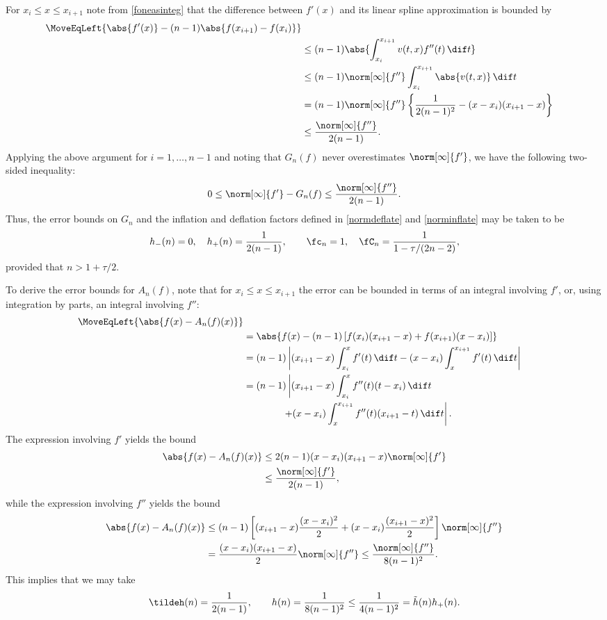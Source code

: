 For $x_{i} \le x \le x_{i+1}$ note from \eqref{foneasinteg} that the difference between $f'(x)$ and its linear spline approximation is bounded by
\begin{align*}
\MoveEqLeft{\abs{f'(x)} - (n-1) \abs{f(x_{i+1})-f(x_i)}} \\
&\le(n-1)\abs{ \int_{x_i}^{x_{i+1}} v(t,x) f''(t) \, \dif t} \\
& \le (n-1) \norm[\infty]{f''}\int_{x_i}^{x_{i+1}} \abs{v(t,x)} \, \dif t \\
&=(n-1)\norm[\infty]{f''} \left \{\frac{1}{2(n-1)^2} - (x-x_i)(x_{i+1}-x) \right\} \\
&\le \frac{\norm[\infty]{f''}}{2(n-1)}.
\end{align*}
Applying the above argument for $i=1, \ldots, n-1$ and noting that $G_n(f)$ never overestimates $\norm[\infty]{f'}$, we have the following two-sided inequality:
\[
0 \le \norm[\infty]{f'} - G_n(f) \le \frac{\norm[\infty]{f''}}{2(n-1)}.
\]
Thus, the error bounds on $G_n$ and the inflation and deflation factors defined in  \eqref{normdeflate} and \eqref{norminflate} may be taken to be
\begin{equation}\label{inflaapprox}
 h_{-}(n)=0, \quad h_{+}(n)=\frac{1}{2(n-1)}, \qquad \fc_n=1, \quad   \fC_n =\frac{1}{1 - \tau /(2n-2)},
\end{equation}
provided that $n>1+\tau/2$.

To derive the error bounds for $A_n(f)$, note that for $x_{i} \le x \le x_{i+1}$ the error can be bounded in terms of an integral involving $f'$, or,  using integration by parts, an integral involving $f''$:
\begin{align*}
\MoveEqLeft{\abs{f(x)-A_n (f)(x)}}\\
&= \abs{f(x) - (n-1) \left[f(x_{i})(x_{i+1}-x) +f(x_{i+1})(x-x_i) \right]}\\
&= (n-1)\left \lvert (x_{i+1}-x) \int_{x_i}^x f'(t) \, \dif t - (x-x_i)  \int_x^{x_{i+1}} f'(t) \, \dif t\right \rvert \\
&= (n-1)\left \lvert (x_{i+1}-x) \int_{x_i}^x f''(t)(t-x_i) \, \dif t \right . \\
&\qquad \qquad \left . + (x-x_i)  \int_x^{x_{i+1}} f''(t)(x_{i+1}-t) \, \dif t\right \rvert .
\end{align*}
The expression involving $f'$ yields the bound
\begin{align*}
\abs{f(x)-A_n (f)(x)}
&\le 2 (n-1)(x-x_i)(x_{i+1}-x)\norm[\infty]{f'} \\
&\le \frac{\norm[\infty]{f'}}{2(n-1)},
\end{align*}
while the expression involving $f''$ yields the bound
\begin{align*}
\abs{f(x)-A_n (f)(x)}
&\le (n-1)\left[(x_{i+1}-x)\frac{(x-x_i)^2}{2} + (x-x_i)\frac{(x_{i+1}-x)^2}{2} \right ]\norm[\infty]{f''} \\
&=\frac{(x-x_i)(x_{i+1}-x)}2 \norm[\infty]{f''} \le \frac{\norm[\infty]{f''}}{8(n-1)^2}.
\end{align*}
This implies that we may take
\begin{equation}
\tildeh(n) =  \frac{1}{2(n-1)}, \qquad h(n) =  \frac{1}{8(n-1)^2} \leq \frac{1}{4(n-1)^2} = \tilde{h}(n) h_{+}(n).
\end{equation}

